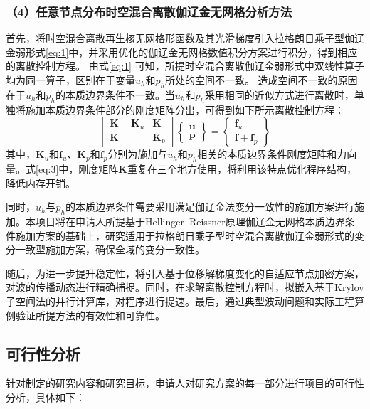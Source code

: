 \subsubsection*{\bfseries （4）任意节点分布时空混合离散伽辽金无网格分析方法}
首先，将时空混合离散再生核无网格形函数及其光滑梯度引入拉格朗日乘子型伽辽金弱形式\eqref{eq:1}中，并采用优化的伽辽金无网格数值积分方案进行积分，得到相应的离散控制方程。
由式\eqref{eq:1} 可知，所提时空混合离散伽辽金弱形式中双线性算子均为同一算子，区别在于变量$u_h$和$p_h$所处的空间不一致。
造成空间不一致的原因在于$u_h$和$p_h$的本质边界条件不一致。当$u_h$和$p_h$采用相同的近似方式进行离散时，单独将施加本质边界条件部分的刚度矩阵分出，可得到如下所示离散控制方程：
\begin{equation}
    \begin{bmatrix} 
        \boldsymbol K + \boldsymbol K_{u} & \boldsymbol K \\
        \boldsymbol K & \boldsymbol K_{p} 
    \end{bmatrix} 
    \begin{Bmatrix}
        \boldsymbol u \\ \boldsymbol p
    \end{Bmatrix} =
    \begin{Bmatrix} \boldsymbol f_u \\ \boldsymbol f + \boldsymbol f_p \end{Bmatrix}
    \label{eq:3} 
\end{equation}
其中，$\boldsymbol K_u$和$\boldsymbol f_u$、$\boldsymbol K_p$和$\boldsymbol f_p$分别为施加与$u_h$和$p_h$相关的本质边界条件刚度矩阵和力向量。式\eqref{eq:3}中，刚度矩阵$\boldsymbol K$重复在三个地方使用，将利用该特点优化程序结构，降低内存开销。

同时，$u_h$与$p_h$的本质边界条件需要采用满足伽辽金法变分一致性的施加方案进行施加。本项目将在申请人所提基于Hellinger--Reissner原理伽辽金无网格本质边界条件施加方案的基础上，研究适用于拉格朗日乘子型时空混合离散伽辽金弱形式的变分一致型施加方案，确保全域的变分一致性。

随后，为进一步提升稳定性，将引入基于位移解梯度变化的自适应节点加密方案，对波的传播动态进行精确捕捉。同时，在求解离散控制方程时，拟嵌入基于Krylov子空间法的并行计算库，对程序进行提速。最后，通过典型波动问题和实际工程算例验证所提方法的有效性和可靠性。

\subsection{可行性分析}
针对制定的研究内容和研究目标，申请人对研究方案的每一部分进行项目的可行性分析，具体如下：

